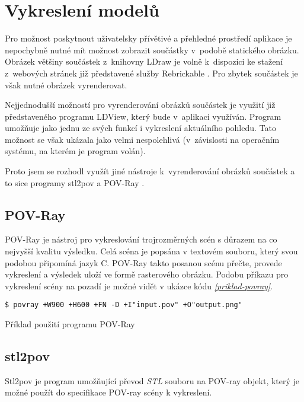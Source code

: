 \section{Vykreslení modelů}\label{reserse-vykresleni}
Pro možnost poskytnout uživatelsky přívětivé a přehledné prostředí aplikace je nepochybně nutné mít možnost zobrazit součástky v~podobě statického obrázku. Obrázek většiny součástek z~knihovny LDraw je volně k~dispozici ke stažení z~webových stránek již představené služby Rebrickable \autocite{rebrickable:download}. Pro zbytek součástek je však nutné obrázek vyrenderovat. 

Nejjednodušší možností pro vyrenderování obrázků součástek je využití již představeného programu LDView, který bude v~aplikaci využíván. Program umožňuje jako jednu ze svých funkcí i vykreslení aktuálního pohledu. Tato možnost se však ukázala jako velmi nespolehlivá (v~závislosti na operačním systému, na kterém je program volán).

Proto jsem se rozhodl využít jiné nástroje k~vyrenderování obrázků součástek a to sice programy stl2pov \autocite{stl2pov} a POV-Ray \autocite{povray}.

\subsection{POV-Ray}
POV-Ray je nástroj pro vykreslování trojrozměrných scén s důrazem na co nejvyšší kvalitu výsledku. Celá scéna je popsána v textovém souboru, který svou podobou připomíná jazyk C. POV-Ray takto posanou scénu přečte, provede vykreslení a výsledek uloží ve formě rasterového obrázku. \autocite{root:povray} Podobu příkazu pro vykreslení scény na pozadí je možné vidět v ukázce kódu \emph{\ref{priklad-povray}}. 

\begin{listing}[htbp]
        \begin{verbatim}
$ povray +W900 +H600 +FN -D +I"input.pov" +O"output.png" 
        \end{verbatim}
    \caption{Příklad použití programu POV-Ray \label{priklad-povray}}
\end{listing}

\subsection{stl2pov}
Stl2pov je program umožňující převod \textit{\gls{STL}} souboru na POV-ray objekt, který je možné použít do specifikace POV-ray scény k vykreslení.  
